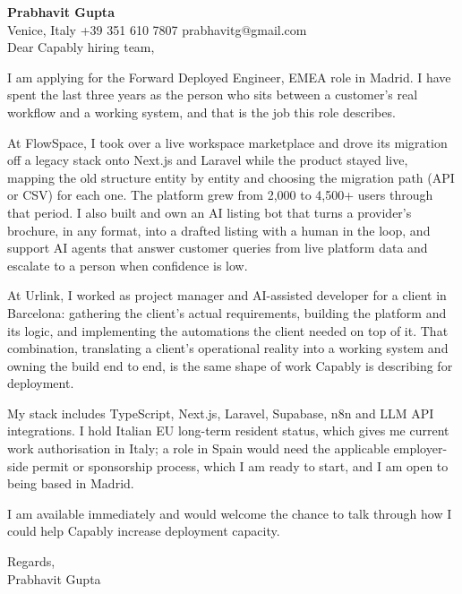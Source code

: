 \documentclass[a4paper,10.5pt]{article}
\begin{document}
\textbf{Prabhavit Gupta}\\
Venice, Italy \textbar{} +39 351 610 7807 \textbar{} prabhavitg@gmail.com\\[10pt]
Dear Capably hiring team,

I am applying for the Forward Deployed Engineer, EMEA role in Madrid. I have spent the last three years as the person who sits between a customer's real workflow and a working system, and that is the job this role describes.

At FlowSpace, I took over a live workspace marketplace and drove its migration off a legacy stack onto Next.js and Laravel while the product stayed live, mapping the old structure entity by entity and choosing the migration path (API or CSV) for each one. The platform grew from 2,000 to 4,500+ users through that period. I also built and own an AI listing bot that turns a provider's brochure, in any format, into a drafted listing with a human in the loop, and support AI agents that answer customer queries from live platform data and escalate to a person when confidence is low.

At Urlink, I worked as project manager and AI-assisted developer for a client in Barcelona: gathering the client's actual requirements, building the platform and its logic, and implementing the automations the client needed on top of it. That combination, translating a client's operational reality into a working system and owning the build end to end, is the same shape of work Capably is describing for deployment.

My stack includes TypeScript, Next.js, Laravel, Supabase, n8n and LLM API integrations. I hold Italian EU long-term resident status, which gives me current work authorisation in Italy; a role in Spain would need the applicable employer-side permit or sponsorship process, which I am ready to start, and I am open to being based in Madrid.

I am available immediately and would welcome the chance to talk through how I could help Capably increase deployment capacity.

Regards,\\
Prabhavit Gupta
\end{document}
